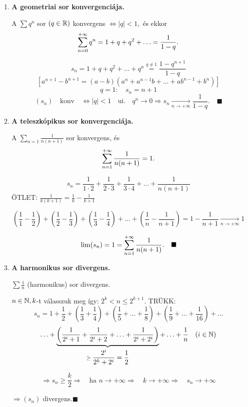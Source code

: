 \documentclass[a4paper,11.5pt]{article}
\begin{document}
	\begin{enumerate}
		\item \textbf{A geometriai sor konvergenciája.}
		
		A $\sum q^n$ sor $(q \in \mathbb{R})$ konvergens $\Leftrightarrow |q|<1,$ és ekkor \[\displaystyle\sum_{n=0}^{+\infty} q^n=1+q+q^2+ \ldots = \frac{1}{1-q}.\]
		
		\biz 
		\[ s_n=1+q+q^2+ \ldots + q^n \overset{q \not=1}{=} \frac{1-q^{n+1}}{1-q} \]
		\[ [a^{n+1}-b^{n+1}=(a-b)(a^n+a^{n-1}b+\ldots+ab^{n-1}+b^n)] \]
		\[ q=1: \quad s_n=n+1 \]
		\[(s_n)\quad\text{konv}\quad \Leftrightarrow |q|<1\quad \text{ui.} \quad q^n \rightarrow 0 \Rightarrow s_n \underset{n\rightarrow+\infty}{\longrightarrow}\frac{1}{1-q}.\quad \blacksquare\]
		
		\item \textbf{A teleszkópikus sor konvergenciája.}
		
		A $\displaystyle\sum_{n=1} \frac{1}{n(n+1)}$ sor konvergens, és \[ \displaystyle\sum_{n=1}^{+\infty} \frac{1}{n(n+1)}=1. \]
		
		\biz \[s_n=\frac{1}{1\cdot2}+\frac{1}{2\cdot3}+\frac{1}{3\cdot4}+\ldots+\frac{1}{n(n+1)}\]
		ÖTLET: $\displaystyle \frac{1}{k(k+1)}=\frac{1}{k}-\frac{1}{k+1}$
		
		\[ \left(\frac{1}{1}-\frac{1}{2}\right)+ \left( \frac{1}{2}-\frac{1}{3} \right)+ \left(\frac{1}{3}-\frac{1}{4}\right)+\ldots+\left(\frac{1}{n}-\frac{1}{n+1}\right)=1-\frac{1}{n+1} \underset{n\rightarrow+\infty}{\longrightarrow} 1\]
		
		\[ \lim(s_n)=1=\displaystyle\sum_{n=1}^{+\infty} \frac{1}{n(n+1)}. \quad \blacksquare\]

		\item \textbf{A harmonikus sor divergens.}
		
		$\displaystyle \sum \frac{1}{n}$ (harmonikus) sor divergens.
		
		\biz $n \in \mathbb{N}, k$-t válasszuk meg így: $2^k<n\leq 2^{k+1}$.
		\textsl{}
		TRÜKK: \[\displaystyle s_n=1+\frac{1}{2}+\left( \frac{1}{3}+ \frac{1}{4} \right)+ \left( \frac{1}{5}+ \ldots +\frac{1}{8} \right)+ \left(\frac{1}{9}+\ldots+\frac{1}{16}\right)+ \ldots \] \[ \ldots+\underbrace{\left(\frac{1}{2^i+1}+\frac{1}{2^i+2}+\ldots+\frac{1}{2^i+2^i}\right)}_{\geq\displaystyle\frac{2^i}{2^k+2^i}=\frac{1}{2}}+ \ldots + \frac{1}{n} \quad (i\in\mathbb{N})\]
		
		\[ \Rightarrow s_n \geq \frac{k}{2} \Rightarrow\quad \text{ha } n\rightarrow+\infty \Rightarrow \quad k \rightarrow+\infty \Rightarrow \quad s_n \rightarrow +\infty \]
		
		$\Rightarrow (s_n)$ divergens.\quad $\blacksquare$
		

\end{enumerate}
\end{document}

